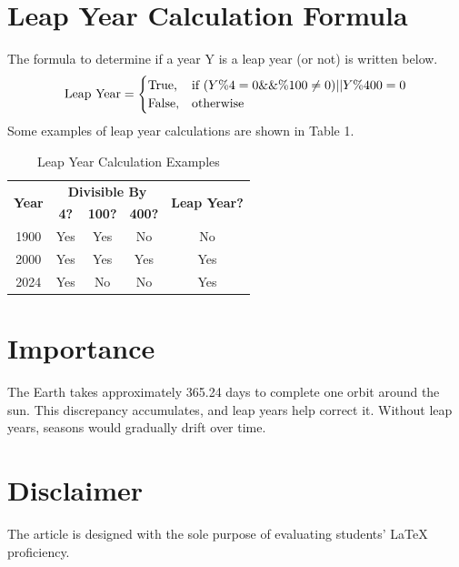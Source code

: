 \documentclass{article}
\begin{document}
\section{Leap Year Calculation Formula}
The formula to determine if a year Y is a leap year (or not) is written below.
\begin{equation*}
    \textnormal{Leap Year} = 
    \begin{cases}
        \text{True,} & \text{if }(Y \% 4 = 0 \&\& \% 100 \neq 0) || Y \% 400 = 0 \\
        \text{False,} & \text{otherwise}
    \end{cases}
\end{equation*}
Some examples of leap year calculations are shown in Table 1.

\begin{table}[htbp]
    \centering
    \begin{tabular}{|c|c|c|c|c|}
        \hline
        \multirow{2}{*}{\textbf{Year}} & \multicolumn{3}{c|}{\textbf{Divisible By}} & \multirow{2}{*}{\textbf{Leap Year?}} \\
        \cline{2-4}
        & \textbf{4?} & \textbf{100?} & \textbf{400?} & \\
        \hline
        1900 & Yes & Yes & No & No \\
        \hline
        2000 & Yes & Yes & Yes & Yes \\
        \hline
        2024 & Yes & No & No & Yes \\
        \hline
    \end{tabular}
    \caption{Leap Year Calculation Examples}
\end{table}

\section{Importance}
The Earth takes approximately 365.24 days to complete one orbit around the
sun. This discrepancy accumulates, and leap years help correct it. Without leap years, seasons would gradually drift over time.

\section*{Disclaimer}
The article is designed with the sole purpose of evaluating students’ \LaTeX{} proficiency.
\pagebreak
\printbibliography
\end{document}
